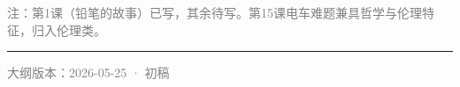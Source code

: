 \documentclass[a4paper,12pt]{ctexart}
\begin{document}
\vspace{0.3cm}

\textcolor{gray}{\small 注：第1课（铅笔的故事）已写，其余待写。第15课电车难题兼具哲学与伦理特征，归入伦理类。}

\vspace{0.5cm}

\begin{center}
\rule{0.5\textwidth}{0.5pt}
\vspace{0.3cm}
\textcolor{gray}{\small 大纲版本：2026-05-25 · 初稿}
\end{center}
\end{document}
